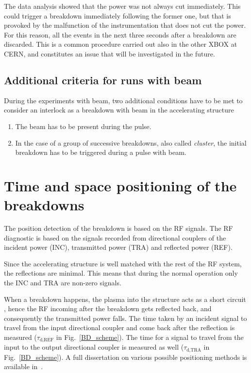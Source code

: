 The data analysis showed that the power was not always cut immediately. This could trigger a breakdown  immediately following the former one, but that is provoked by the malfunction of the instrumentation that does not cut the power. For this reason, all the events in the next three seconds after a breakdown are discarded. This is a common procedure carried out also in the other XBOX at CERN, and constitutes an issue that will be investigated in the future. 


\subsection[Additional criteria for runs with beam]{Additional criteria for runs with beam}

During the experiments with beam, two additional conditions have to be met to consider an interlock as a breakdown with beam in the accelerating structure
\begin{enumerate}
\item The beam has to be present during the pulse.
\item In the case of a group of successive breakdowns, also called \textit{cluster}, the initial breakdown has to be triggered during a pulse with beam.
\end{enumerate}





\section[Time and space positioning of the breakdowns]{Time and space positioning of the breakdowns}

The position detection of the breakdown is based on the RF signals. The RF diagnostic is based on the signals recorded from directional couplers of the incident power (INC), transmitted power (TRA) and reflected power (REF). 

Since the accelerating structure is well matched with the rest of the RF system, the reflections are minimal. This means that during the normal operation only the INC and TRA are non-zero signals.

When a breakdown happens, the plasma into the structure acts as a short circuit \cite{Degiovanni:2025952}, hence the RF incoming after the breakdown gets reflected back, and consequently the transmitted power falls. The time taken by an incident signal to travel from the input directional coupler and come back after the reflection is measured ($\tau_\text{d,REF}$  in Fig.~\ref{BD_scheme}). The time for a signal to travel from the input to the output directional coupler is measured as well ($\tau_\text{d,TRA}$ in Fig.~\ref{BD_scheme}).  A full dissertation on various possible positioning methods is available in~\cite{Rajamaki:2143815}.

